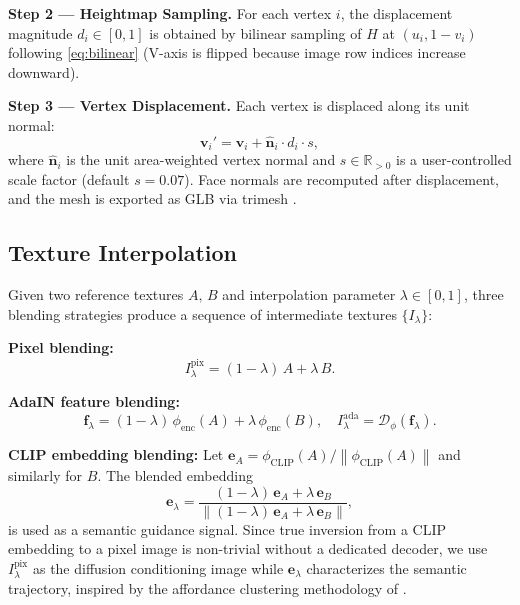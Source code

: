 \documentclass[conference]{IEEEtran}
\newcommand{\R}{\mathbb{R}}
\newcommand{\norm}[1]{\left\lVert#1\right\rVert}
\begin{document}
\textbf{Step 2 — Heightmap Sampling.} For each vertex $i$, the displacement
magnitude $d_i \in [0,1]$ is obtained by bilinear sampling of $H$ at
$(u_i, 1-v_i)$ following \eqref{eq:bilinear} (V-axis is flipped because
image row indices increase downward).

\textbf{Step 3 — Vertex Displacement.} Each vertex is displaced along its
unit normal:
\begin{equation}
  \mathbf{v}_i' = \mathbf{v}_i + \hat{\mathbf{n}}_i \cdot d_i \cdot s,
  \label{eq:displacement}
\end{equation}
where $\hat{\mathbf{n}}_i$ is the unit area-weighted vertex normal and
$s \in \R_{>0}$ is a user-controlled scale factor (default $s=0.07$).
Face normals are recomputed after displacement, and the mesh is exported
as GLB via trimesh \cite{b15}.

\subsection{Texture Interpolation}
\label{sec:interp}

Given two reference textures $A,\,B$ and interpolation parameter
$\lambda \in [0,1]$, three blending strategies produce a sequence of
intermediate textures $\{I_\lambda\}$:

\textbf{Pixel blending:}
\begin{equation}
  I_\lambda^{\text{pix}} = (1-\lambda)\,A + \lambda\,B.
  \label{eq:interp_pixel}
\end{equation}

\textbf{AdaIN feature blending:}
\begin{equation}
  \mathbf{f}_\lambda = (1-\lambda)\,\phi_{\text{enc}}(A) + \lambda\,\phi_{\text{enc}}(B),
  \quad I_\lambda^{\text{ada}} = \mathcal{D}_\phi(\mathbf{f}_\lambda).
  \label{eq:interp_adain}
\end{equation}

\textbf{CLIP embedding blending:} Let
$\mathbf{e}_A = \phi_{\text{CLIP}}(A)/\norm{\phi_{\text{CLIP}}(A)}$ and
similarly for $B$. The blended embedding
\begin{equation}
  \mathbf{e}_\lambda =
    \frac{(1-\lambda)\,\mathbf{e}_A + \lambda\,\mathbf{e}_B}
         {\norm{(1-\lambda)\,\mathbf{e}_A + \lambda\,\mathbf{e}_B}},
  \label{eq:interp_clip}
\end{equation}
is used as a semantic guidance signal. Since true inversion from a CLIP
embedding to a pixel image is non-trivial without a dedicated decoder,
we use $I_\lambda^{\text{pix}}$ as the diffusion conditioning image while
$\mathbf{e}_\lambda$ characterizes the semantic trajectory, inspired by the
affordance clustering methodology of \cite{b16}.
\end{document}
